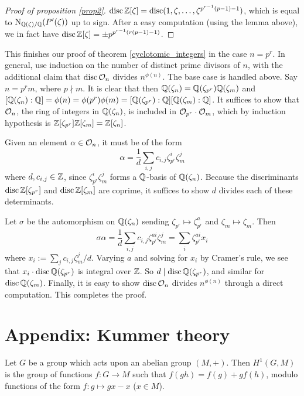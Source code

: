 \documentclass[11pt]{amsart}
\begin{document}
\begin{proof}[Proof of proposition \ref{prop2}]
$\operatorname{disc} \mathbb{Z}[\zeta] = \operatorname{disc}(1,\zeta,\dots,\zeta^{p^{r-1}(p-1)-1})$, which is equal to $\operatorname{N}_{\mathbb{Q}(\zeta)/\mathbb{Q}}(P'(\zeta))$ up to sign. After a easy computation (using the lemma above), we in fact have $\operatorname{disc} \mathbb{Z}[\zeta] = \pm p^{p^{r-1}(r(p-1)-1)}$.
\end{proof}

This finishes our proof of theorem \ref{cyclotomic_integers} in the case $n = p^r$. In general, use induction on the number of distinct prime divisors of $n$, with the additional claim that $\operatorname{disc} \mathcal{O}_n$ divides $n^{\phi(n)}$. The base case is handled above. Say $n = p^{r}m$, where $p\nmid m$. It is clear that then $\mathbb{Q}(\zeta_{n}) = \mathbb{Q}(\zeta_{p^r})\mathbb{Q}(\zeta_{m})$ and $[\mathbb{Q}(\zeta_n):\mathbb{Q}] = \phi(n) = \phi(p^r)\phi(m) = [\mathbb{Q}(\zeta_{p^r}):\mathbb{Q}][\mathbb{Q}(\zeta_m):\mathbb{Q}]$. It suffices to show that $\mathcal{O}_n$, the ring of integers in $\mathbb{Q}(\zeta_n)$, is included in $\mathcal{O}_{p^r}\cdot \mathcal{O}_m$, which by induction hypothesis is $\mathbb{Z}[\zeta_{p^r}]\mathbb{Z}[\zeta_{m}] = \mathbb{Z}[\zeta_n]$.

Given an element $\alpha\in \mathcal{O}_n$, it must be of the form
\[\alpha = \frac{1}{d}\sum_{i,j} c_{i,j}\zeta_{p^r}^i \zeta_{m}^j\]
where $d,c_{i,j}\in \mathbb{Z}$, since $\zeta_{p^r}^i \zeta_{m}^j$ forms a $\mathbb{Q}$-basis of $\mathbb{Q}(\zeta_n)$. Because the discriminants $\operatorname{disc} \mathbb{Z}[\zeta_{p^r}]$ and $\operatorname{disc} \mathbb{Z}[\zeta_{m}]$ are coprime, it suffices to show $d$ divides each of these determinants.

Let $\sigma$ be the automorphism on $\mathbb{Q}(\zeta_{n})$ sending $\zeta_{p^r} \mapsto \zeta_{p^r}^a$ and $\zeta_{m}\mapsto \zeta_m$. Then
\[\sigma\alpha = \frac{1}{d}\sum_{i,j} c_{i,j}\zeta_{p^r}^{ai} \zeta_{m}^j = \sum_{i} \zeta_{p^r}^{ai} x_i\]
where $x_i := \sum_j c_{i,j}\zeta_m^j/d$. Varying $a$ and solving for $x_i$ by Cramer's rule, we see that $x_i\cdot \operatorname{disc} \mathbb{Q}(\zeta_{p^r})$ is integral over $\mathbb{Z}$. So $d\mid \operatorname{disc} \mathbb{Q}(\zeta_{p^r})$, and similar for $\operatorname{disc} \mathbb{Q}(\zeta_m)$. Finally, it is easy to show $\operatorname{disc} \mathcal{O}_n$ divides $n^{\phi(n)}$ through a direct computation. This completes the proof.


\section{Appendix: Kummer theory}


\begin{defn}
    Let $G$ be a group which acts upon an abelian group $(M,+)$. Then $H^1(G,M)$ is the group of functions $f: G\to M$ such that $f(gh) = f(g) + gf(h)$, modulo functions of the form $f: g\mapsto gx - x$ ($x\in M$).
\end{defn}
\end{document}
